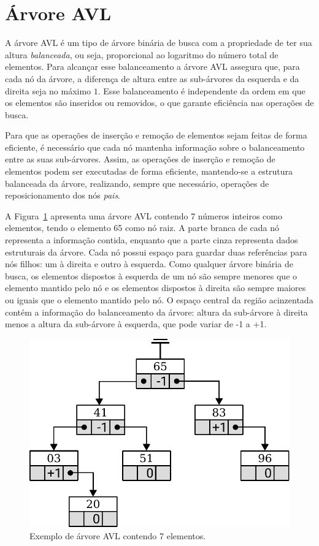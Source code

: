 \section{Árvore AVL}

A árvore AVL é um tipo de árvore binária de busca com a propriedade de ter sua altura
\emph{balanceada}, ou seja, proporcional ao logaritmo do número total de elementos.
Para alcançar esse balanceamento a árvore AVL assegura que, para cada nó da árvore,
a diferença de altura entre as sub-árvores da esquerda e da direita seja no máximo $1$.
Esse balanceamento é independente da ordem em que os elementos são inseridos
ou removidos, o que garante eficiência nas operações de busca.

Para que as operações de inserção e remoção de elementos sejam feitas de forma eficiente,
é necessário que cada nó mantenha informação sobre o
balanceamento entre as suas sub-árvores.
Assim, as operações de inserção e remoção de elementos podem ser executadas de forma
eficiente, mantendo-se a estrutura balanceada da árvore, realizando,
sempre que necessário, operações de reposicionamento dos nós \emph{pais}.

A Figura~\ref{fig:avl-model} apresenta uma árvore AVL contendo 7 números
inteiros como elementos, tendo o elemento 65 como nó raiz.
A parte branca de cada nó representa a informação contida, enquanto que a
parte cinza representa dados estruturais da árvore.
Cada nó possui espaço para guardar duas referências para nós filhos: um
à direita e outro à esquerda.
Como qualquer árvore binária de busca, os elementos dispostos à esquerda de um nó são sempre menores que o elemento mantido pelo nó e os elementos dispostos à direita são sempre
maiores ou iguais que o elemento mantido pelo nó.
O espaço central da região acinzentada contém a informação do balanceamento da árvore: altura da sub-árvore à direita menos a altura da sub-árvore à esquerda, que pode variar de -1 a +1.

\begin{figure}[ht]
  \centering
  \includegraphics[scale=0.6]{img/kdt/avl-model}
  \caption{Exemplo de árvore AVL contendo 7 elementos.}
  \label{fig:avl-model}
\end{figure}

